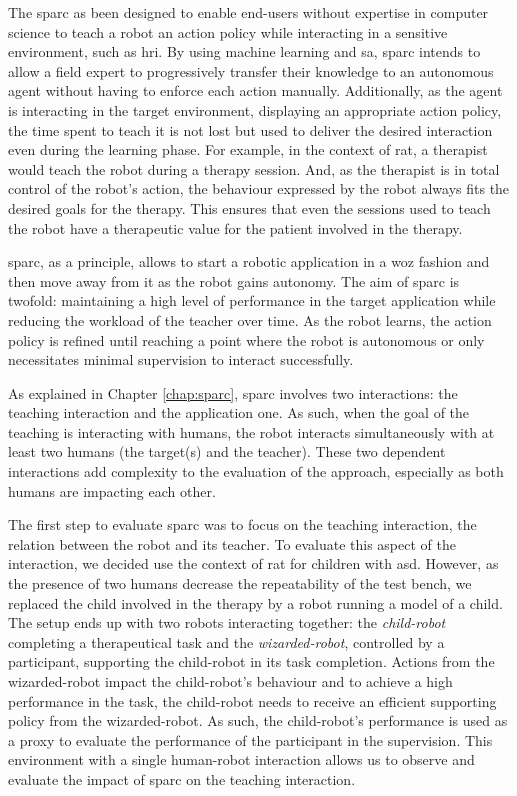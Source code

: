 The \gls{sparc} as been designed to enable end-users without expertise in computer science to teach a robot an action policy while interacting in a sensitive environment, such as \gls{hri}. By using machine learning and \gls{sa}, \gls{sparc} intends to allow a field expert to progressively transfer their knowledge to an autonomous agent without having to enforce each action manually. Additionally, as the agent is interacting in the target environment, displaying an appropriate action policy, the time spent to teach it is not lost but used to deliver the desired interaction even during the learning phase. For example, in the context of \gls{rat}, a therapist would teach the robot during a therapy session. And, as the therapist is in total control of the robot's action, the behaviour expressed by the robot always fits the  desired goals for the therapy. This ensures that even the sessions used to teach the robot have a therapeutic value for the patient involved in the therapy.

\gls{sparc}, as a principle, allows to start a robotic application in a \gls{woz} fashion and then move away from it as the robot gains autonomy. The aim of \gls{sparc} is twofold: maintaining a high level of performance in the target application while reducing the workload of the teacher over time. As the robot learns, the action policy is refined until reaching a point where the robot is autonomous or only necessitates minimal supervision to interact successfully. 

As explained in Chapter \ref{chap:sparc}, \gls{sparc} involves two interactions: the teaching interaction and the application one. As such, when the goal of the teaching is interacting with humans, the robot interacts simultaneously with at least two humans (the target(s) and the teacher). These two dependent interactions add complexity to the evaluation of the approach, especially as both humans are impacting each other. 

The first step to evaluate \gls{sparc} was to focus on the teaching interaction, the relation between the robot and its teacher. To evaluate this aspect of the interaction, we decided use the context of \gls{rat} for children with \gls{asd}. However, as the presence of two humans decrease the repeatability of the test bench, we replaced the child involved in the therapy by a robot running a model of a child. The setup ends up with two robots interacting together: the \emph{child-robot} completing a therapeutical task and the \emph{wizarded-robot}, controlled by a participant, supporting the child-robot in its task completion. Actions from the wizarded-robot impact the child-robot's behaviour and to achieve a high performance in the task, the child-robot needs to receive an efficient supporting policy from the wizarded-robot. As such, the child-robot's performance is used as a proxy to evaluate the performance of the participant in the supervision. This environment with a single human-robot interaction allows us to observe and evaluate the impact of \gls{sparc} on the teaching interaction.

